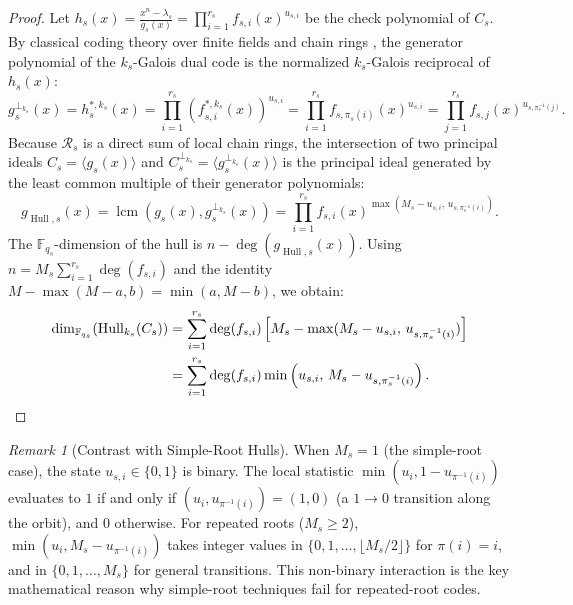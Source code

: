 \documentclass[preprint,12pt]{elsarticle}
\newcommand{\lcm}{\operatorname{lcm}}
\numberwithin{equation}{section}
\theoremstyle{plain}
\theoremstyle{definition}
\theoremstyle{remark}
\newtheorem{remark}[theorem]{Remark}
\begin{document}
\begin{proof}
Let $h_s(x) = \frac{x^n - \lambda_s}{g_s(x)} = \prod_{i=1}^{r_s} f_{s, i}(x)^{u_{s, i}}$ be the check polynomial of $C_s$. By classical coding theory over finite fields and chain rings \cite{Huffman2003,Dinh2004}, the generator polynomial of the $k_s$-Galois dual code is the normalized $k_s$-Galois reciprocal of $h_s(x)$:
\begin{equation}
    g_s^{\perp_{k_s}}(x) = h_s^{*, k_s}(x) = \prod_{i=1}^{r_s} \left(f_{s, i}^{*, k_s}(x)\right)^{u_{s, i}} = \prod_{i=1}^{r_s} f_{s, \pi_s(i)}(x)^{u_{s, i}} = \prod_{j=1}^{r_s} f_{s, j}(x)^{u_{s, \pi_s^{-1}(j)}}.
\end{equation}
Because $\mathcal{R}_s$ is a direct sum of local chain rings, the intersection of two principal ideals $C_s = \langle g_s(x)\rangle$ and $C_s^{\perp_{k_s}} = \langle g_s^{\perp_{k_s}}(x)\rangle$ is the principal ideal generated by the least common multiple of their generator polynomials:
\begin{equation}
    g_{\operatorname{Hull}, s}(x) = \lcm(g_s(x), g_s^{\perp_{k_s}}(x)) = \prod_{i=1}^{r_s} f_{s, i}(x)^{\max(M_s - u_{s, i}, \, u_{s, \pi_s^{-1}(i)})}.
\end{equation}
The $\mathbb{F}_{q_s}$-dimension of the hull is $n - \deg(g_{\operatorname{Hull}, s}(x))$. Using $n = M_s \sum_{i=1}^{r_s} \deg(f_{s, i})$ and the identity $M - \max(M - a, b) = \min(a, M - b)$, we obtain:
\begin{align*}
    \dim_{\mathbb{F}_{q_s}}(\operatorname{Hull}_{k_s}(C_s)) &= \sum_{i=1}^{r_s} \deg(f_{s, i}) \left[ M_s - \max(M_s - u_{s, i}, \, u_{s, \pi_s^{-1}(i)}) \right] \\
    &= \sum_{i=1}^{r_s} \deg(f_{s, i}) \min\left(u_{s, i}, \, M_s - u_{s, \pi_s^{-1}(i)}\right). \qedhere
\end{align*}
\end{proof}

\begin{remark}[Contrast with Simple-Root Hulls]
When $M_s = 1$ (the simple-root case), the state $u_{s, i} \in \{0, 1\}$ is binary. The local statistic $\min(u_i, 1 - u_{\pi^{-1}(i)})$ evaluates to $1$ if and only if $(u_i, u_{\pi^{-1}(i)}) = (1, 0)$ (a $1 \to 0$ transition along the orbit), and $0$ otherwise. For repeated roots ($M_s \ge 2$), $\min(u_i, M_s - u_{\pi^{-1}(i)})$ takes integer values in $\{0, 1, \dots, \lfloor M_s/2\rfloor\}$ for $\pi(i)=i$, and in $\{0, 1, \dots, M_s\}$ for general transitions. This non-binary interaction is the key mathematical reason why simple-root techniques fail for repeated-root codes.
\end{remark}
\end{document}
